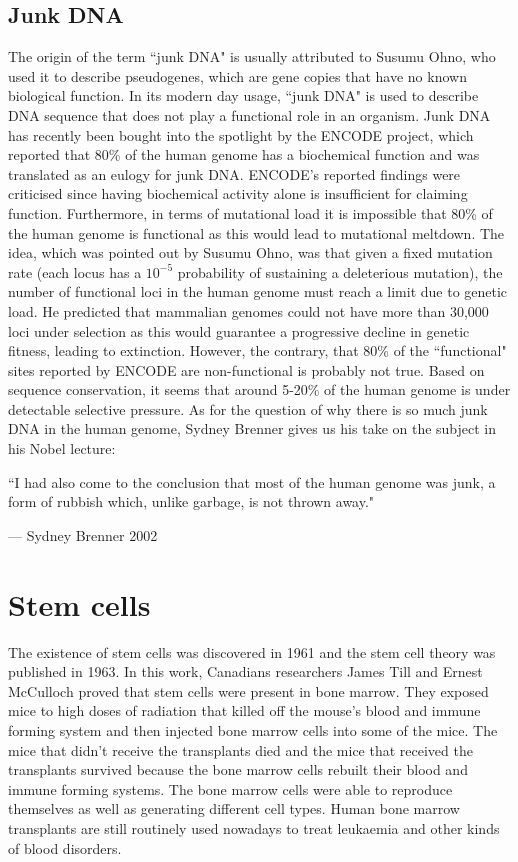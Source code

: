 \subsection{Junk DNA}

The origin of the term ``junk DNA" is usually attributed to Susumu Ohno\cite{pmid5065367}, who used it to describe pseudogenes, which are gene copies that have no known biological function. In its modern day usage, ``junk DNA" is used to describe DNA sequence that does not play a functional role in an organism. Junk DNA has recently been bought into the spotlight by the ENCODE project, which reported that 80\% of the human genome has a biochemical function\cite{pmid22955616} and was translated as an eulogy for junk DNA\cite{Pennisi07092012}. ENCODE's reported findings were criticised since having biochemical activity alone is insufficient for claiming function\cite{pmid23431001, pmid23479647, Eddy2012}. Furthermore, in terms of mutational load it is impossible that 80\% of the human genome is functional as this would lead to mutational meltdown\cite{pmid24809441}. The idea, which was pointed out by Susumu Ohno\cite{pmid5065367}, was that given a fixed mutation rate (each locus has a $10^{-5}$ probability of sustaining a deleterious mutation), the number of functional loci in the human genome must reach a limit due to genetic load. He predicted that mammalian genomes could not have more than 30,000 loci under selection as this would guarantee a progressive decline in genetic fitness, leading to extinction. However, the contrary, that 80\% of the ``functional" sites reported by ENCODE are non-functional is probably not true. Based on sequence conservation, it seems that around 5-20\% of the human genome is under detectable selective pressure\cite{Eddy2012}. As for the question of why there is so much junk DNA in the human genome, Sydney Brenner gives us his take on the subject in his Nobel lecture\cite{brennernobellecture}:

\epigraph{``I had also come to the conclusion that most of the human genome was junk, a form of rubbish which, unlike garbage, is not thrown away."}{--- \textup{Sydney Brenner 2002}}

\section{Stem cells}

The existence of stem cells was discovered in 1961 and the stem cell theory was published in 1963\cite{pmid13970094}. In this work, Canadians researchers James Till and Ernest McCulloch proved that stem cells were present in bone marrow. They exposed mice to high doses of radiation that killed off the mouse's blood and immune forming system and then injected bone marrow cells into some of the mice. The mice that didn't receive the transplants died and the mice that received the transplants survived because the bone marrow cells rebuilt their blood and immune forming systems. The bone marrow cells were able to reproduce themselves as well as generating different cell types. Human bone marrow transplants are still routinely used nowadays to treat leukaemia and other kinds of blood disorders.

